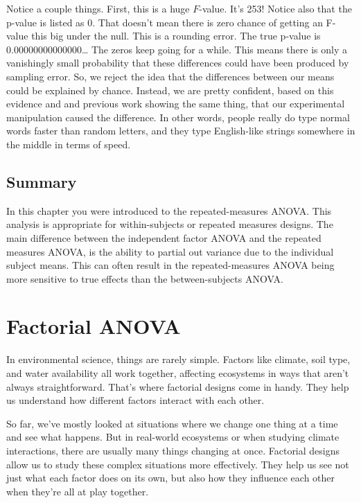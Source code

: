\documentclass[
  letterpaper,
  DIV=11,
  numbers=noendperiod]{scrreprt}
\begin{document}
Notice a couple things. First, this is a huge \(F\)-value. It's 253!
Notice also that the p-value is listed as 0. That doesn't mean there is
zero chance of getting an F-value this big under the null. This is a
rounding error. The true p-value is 0.00000000000000\ldots{} The zeros
keep going for a while. This means there is only a vanishingly small
probability that these differences could have been produced by sampling
error. So, we reject the idea that the differences between our means
could be explained by chance. Instead, we are pretty confident, based on
this evidence and and previous work showing the same thing, that our
experimental manipulation caused the difference. In other words, people
really do type normal words faster than random letters, and they type
English-like strings somewhere in the middle in terms of speed.

\section{Summary}\label{summary-2}

In this chapter you were introduced to the repeated-measures ANOVA. This
analysis is appropriate for within-subjects or repeated measures
designs. The main difference between the independent factor ANOVA and
the repeated measures ANOVA, is the ability to partial out variance due
to the individual subject means. This can often result in the
repeated-measures ANOVA being more sensitive to true effects than the
between-subjects ANOVA.


\chapter{Factorial ANOVA}\label{factorial-anova}

In environmental science, things are rarely simple. Factors like
climate, soil type, and water availability all work together, affecting
ecosystems in ways that aren't always straightforward. That's where
factorial designs come in handy. They help us understand how different
factors interact with each other.

So far, we've mostly looked at situations where we change one thing at a
time and see what happens. But in real-world ecosystems or when studying
climate interactions, there are usually many things changing at once.
Factorial designs allow us to study these complex situations more
effectively. They help us see not just what each factor does on its own,
but also how they influence each other when they're all at play
together.
\end{document}
